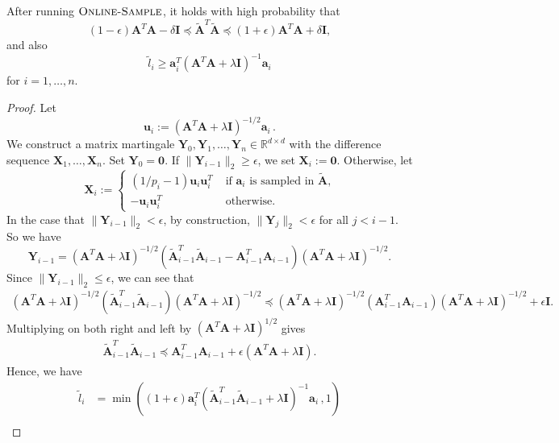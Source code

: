 \documentclass{toc}
\newcommand{\bv}[1]{\mathbf{#1}}
\newcommand{\norm}[1]{\|#1\|}
\begin{document}
\begin{lemma}
    \label{lem:online-sample}
    After running $\textsc{Online-Sample}$, it holds with high probability that
    $$
        (1-\epsilon)\bv{A}^T\bv{A} - \delta\bv{I} \preceq \bv{\tilde{A}}^T\bv{\tilde{A}} \preceq (1+\epsilon)\bv{A}^T\bv{A} + \delta\bv{I},
    $$
    and also
    $$
        \tilde{l}_i \geq \bv{a}_i^T (\bv{A}^T\bv{A} + \lambda\bv{I})^{-1} \bv{a}_i
    $$
    for $i = 1, \ldots, n$.
\end{lemma}
\begin{proof}
    Let
    $$
        \bv{u}_i := (\bv{A}^T\bv{A} + \lambda \bv{I})^{-1/2} \bv{a}_i\,.
    $$
    We construct a matrix martingale $\bv{Y}_0, \bv{Y}_1, \ldots, \bv{Y}_n \in \mathbb{R}^{d\times d}$ with the difference sequence $\bv{X}_1, \ldots, \bv{X}_n$.
    Set $\bv {Y}_0 = \bv 0$. If $\norm{\bv{Y}_{i-1}}_2 \geq \epsilon$, we set $\bv{X}_i := \bv{0}$.
    Otherwise, let
    $$
        \bv{X}_i :=
        \begin{cases}
            (1/p_i - 1) \bv{u}_i \bv{u}_i^T &\mbox{ if $\bv{a}_i$ is sampled in $\bv{\tilde A}$,}\\
            - \bv{u}_i \bv{u}_i^T &\mbox{ otherwise.}
        \end{cases}
    $$
    In the case that $\norm{\bv{Y}_{i-1}}_2 < \epsilon$, by construction, $\norm{\bv{Y}_{j}}_2 < \epsilon$ for all $j < i-1$. 
So we have %
    $$
        \bv{Y}_{i-1} = (\bv{A}^T\bv{A} + \lambda \bv{I})^{-1/2}(\bv{\tilde{A}}_{i-1}^T\bv{\tilde{A}}_{i-1} - \bv{A}_{i-1}^T\bv{A}_{i-1})(\bv{A}^T\bv{A} + \lambda \bv{I})^{-1/2}.
    $$
    Since $\norm{\bv{Y}_{i-1}}_2 \le \epsilon$, we can see that
    \begin{align*}
     (\bv{A}^T\bv{A} + \lambda \bv{I})^{-1/2}(\bv{\tilde{A}}_{i-1}^T\bv{\tilde{A}}_{i-1})(\bv{A}^T\bv{A} + \lambda \bv{I})^{-1/2} \preceq   (\bv{A}^T\bv{A} + \lambda \bv{I})^{-1/2}(\bv{A}_{i-1}^T\bv{A}_{i-1}) (\bv{A}^T\bv{A} + \lambda \bv{I})^{-1/2} + \epsilon \bv{I}.
    \end{align*}
    Multiplying on both right and left by  $(\bv{A}^T\bv{A} + \lambda \bv{I})^{1/2}$ gives
    \begin{align*}
    \bv{\tilde{A}}_{i-1}^T\bv{\tilde{A}}_{i-1} \preceq \bv{A}_{i-1}^T\bv{A}_{i-1} + \epsilon (\bv{A}^T\bv{A} + \lambda \bv{I}).
    \end{align*}
    Hence, we have
    \begin{align}
        \tilde{l}_i &= \min((1+\epsilon)\bv{a}_i^T (\bv{\tilde{A}}_{i-1}^T \bv{\tilde{A}}_{i-1} + \lambda \bv{I})^{-1} \bv{a}_i\,, 1) \nonumber \\

\end{align}
\end{proof}
\end{document}
